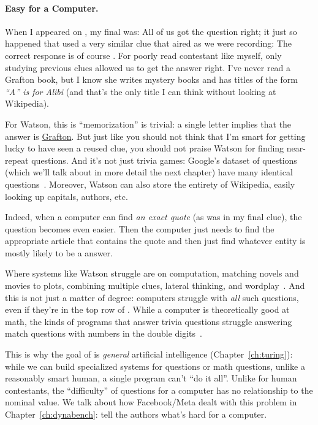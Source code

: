 \paragraph{Easy for a Computer.}

When I appeared on \jeopardyp{}, my final \jeopardy{} was:
%
All of us got the question right; it just so happened that \jeopardy{}
used a very similar clue that aired as we were recording:
%
%
The correct response is of course .
%
For poorly read contestant like myself, only studying previous clues
allowed us to get the answer right.
%
I've never read a Grafton book, but I know she writes mystery books and
has titles of the form \textit{``A'' is for Alibi} (and that's the
only title I can think without looking at Wikipedia).

For Watson, this is ``memorization'' is trivial: a single letter
implies that the answer is \underline{Grafton}.
%
But just like you should not think that I'm smart for getting lucky to
have seen a reused clue, you should not praise Watson for finding
near-repeat questions.
%
And it's not just trivia games: Google's dataset of questions (which
we'll talk about in more detail the next chapter) have
many identical questions~\citep{lewis-21}.
%
Moreover, Watson can also store the entirety of Wikipedia, easily
looking up capitals, authors, etc.

Indeed, when a computer can find \emph{an exact quote} (as was in my
final \jeopardy{} clue), the question becomes even easier.
%
Then the computer just needs to find the appropriate article that
contains the quote and then just find whatever entity is mostly likely
to be a \jeopardyp{} answer.

Where systems like Watson struggle are on computation, matching novels
and movies to plots, combining multiple clues, lateral thinking, and
wordplay~\citep{kaushik-18}.
%
And this is not just a matter of degree: computers struggle with \emph{all}
such questions, even if they're in the top row of \jeopardyp{}.
%
While a computer is theoretically good at math, the kinds of programs
that answer trivia questions struggle answering match questions with
numbers in the double digits~\citep{wallace-19:numbers}.

This is why the goal of  is \emph{general} artificial
intelligence (Chapter~\ref{ch:turing}): while we can build specialized
systems for \jeopardy{} questions or math questions, unlike a
reasonably smart human, a single program can't ``do it all''.
%
Unlike for human contestants, the ``difficulty'' of \jeopardy{}
questions for a computer has no relationship to the nominal value.
%
We talk about how Facebook/Meta dealt with this problem in
Chapter~\ref{ch:dynabench}: tell the authors what's hard for a computer.


